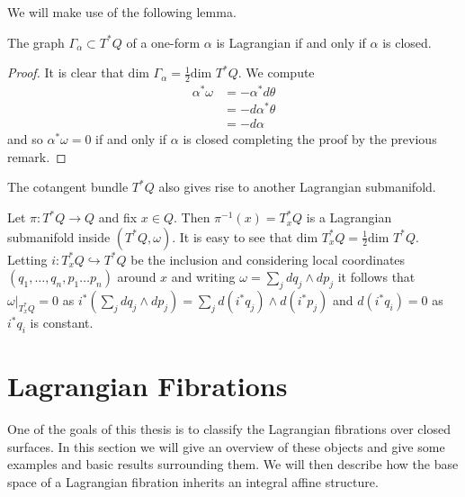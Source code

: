 We will make use of the following lemma.
\begin{lemma}
    \label{lemma:cotangent-lagrangian-sub}
    The graph $\Gamma_{\alpha} \subset T^*Q$ of a one-form $\alpha$ is Lagrangian if and only if $\alpha$ is closed.
\end{lemma}
\begin{proof}
    It is clear that $\text{dim }\Gamma_{\alpha} =\frac{1}{2}\text{dim }T^*Q$. We compute
    \begin{align*}
        \alpha^*\omega & = -\alpha^*d\theta   \\
                       & = - d\alpha^* \theta \\
                       & = - d\alpha
    \end{align*}
    and so $\alpha^* \omega = 0 $ if and only if $\alpha$ is closed completing the proof by the previous remark.
\end{proof}

The cotangent bundle $T^*Q$ also gives rise to another Lagrangian submanifold.

\begin{eg}
    Let $\pi : T^*Q \to Q$ and fix $x \in Q$. Then $\pi^{-1}(x) = T_x^*Q$ is a Lagrangian submanifold inside $(T^*Q, \omega)$. It is easy to see that $\text{dim }T_x^*Q = \frac{1}{2}\text{dim }T^*Q $.
    Letting $i: T_x^*Q \hookrightarrow T^*Q$ be the inclusion and considering local coordinates $(q_1, \dots , q_n, p_1 \dots p_n)$ around $x$ and writing $\omega = \sum_j dq_j \wedge dp_j$ it follows that $\omega|_{T_x^*Q} = 0$ as $i^*(\sum_j dq_j \wedge dp_j) = \sum_j d(i^*q_j) \wedge d(i^*p_j)$ and
    $d(i^*q_i) = 0$ as $i^*q_i$ is constant.
\end{eg}

\section{Lagrangian Fibrations}

One of the goals of this thesis is to classify the Lagrangian fibrations over
closed surfaces. In this section we will give an overview of these objects and
give some examples and basic results surrounding them. We will then describe
how the base space of a Lagrangian fibration inherits an integral affine
structure.

